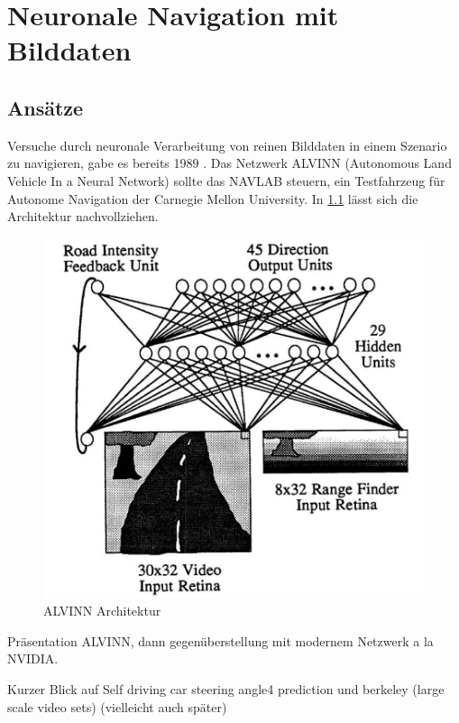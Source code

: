 %
\chapter{Neuronale Navigation mit Bilddaten}

\section{Ansätze}

Versuche durch neuronale Verarbeitung von reinen Bilddaten in einem Szenario zu navigieren, gabe es bereits 1989 \cite{pomerleau1989alvinn}.
Das Netzwerk ALVINN (Autonomous Land Vehicle In a Neural Network) sollte das NAVLAB steuern, ein Testfahrzeug für Autonome Navigation der Carnegie Mellon University.
In \ref{img:ALVINN} lässt sich die Architektur nachvollziehen. 


\begin{figure}
	\centering
	\includegraphics[scale=0.8]{figures/Architecture-ALVINN.png}
	\caption{ALVINN Architektur}
	\label{img:ALVINN}
\end{figure}

 Präsentation ALVINN, dann gegenüberstellung mit modernem Netzwerk a la NVIDIA.

Kurzer Blick auf  Self driving car steering angle4 prediction und berkeley (large scale video sets) (vielleicht auch später)







